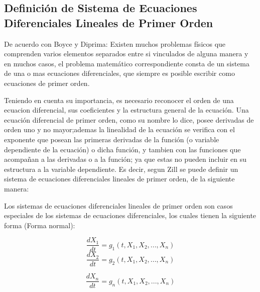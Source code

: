 \documentclass[titlepage]{article}
\begin{document}
        

        \subsection{Definición de Sistema de Ecuaciones Diferenciales Lineales de Primer Orden}\par
        
        De acuerdo con Boyce y Diprima: Existen muchos problemas físicos que comprenden varios elementos separados entre si vinculados de alguna manera y en muchos casos, el problema matemático correspondiente consta de un sistema de una o mas ecuaciones diferenciales, que siempre es posible escribir como ecuaciones de primer orden.\cite{Boyce2003}\par\vspace{0.4cm}
        Teniendo en cuenta su importancia, es necesario reconocer el orden de una ecuacion diferencial, sus coeficientes y la estructura general de la ecuación. Una ecuación diferencial de primer orden, como su nombre lo dice, posee derivadas de orden uno y no mayor;ademas la linealidad de la ecuación se verifica con el exponente que posean las primeras derivadas de la función (o variable dependiente de la ecuación) o dicha función, y tambien con las funciones que acompañan a las derivadas o a la función; ya que estas no pueden incluir en su estructura a la variable dependiente. Es decir, segun Zill se puede definir un sistema de ecuaciones diferenciales lineales de primer orden, de la siguiente manera: \par\vspace{0.4cm}
        
        Los sistemas de ecuaciones diferenciales lineales de primer orden son casos especiales de los sistemas de ecuaciones diferenciales, los cuales tienen la siguiente forma (Forma normal):\par\vspace{0.4cm}
        
        \begin{equation*}
            \frac{dX_1}{dt}  = g_1(t,X_1,X_2,...,X_n)
        \end{equation*}
        \begin{equation*}   
            \frac{dX_2}{dt}  = g_2(t,X_1,X_2,...,X_n)
        \end{equation*}
       
        \begin{equation*}   
            \frac{dX_n}{dt} = g_n(t,X_1,X_2,...,X_n)
        \end{equation*}\vspace{0.2cm}
            
\end{document}
